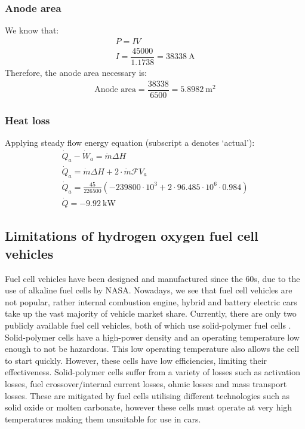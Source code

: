 \documentclass[11pt]{article}
\numberwithin{equation}{section}
\begin{document}
\subsubsection{Anode area}
We know that:
\begin{gather}
    P = IV\\
    I = \dfrac{45000}{1.1738} = \SI{38338}{\ampere}
\end{gather}
Therefore, the anode area necessary is:
\begin{gather}
    \textrm{Anode area} = \dfrac{38338}{6500} = \SI{5.8982}{\meter\squared}
\end{gather}
\subsubsection{Heat loss}
Applying steady flow energy equation (subscript a denotes `actual'):
\begin{gather}
    \dot{Q}_a - \dot{W}_a = \dot{m}\Delta H\\
    \dot{Q}_a = \dot{m}\Delta H + 2 \cdot \dot{m} \mathcal{F}V_{a}\\
    \dot{Q}_a = \frac{45}{226500}\left(-239800\cdot 10^3 + 2\cdot 96.485\cdot 10^6 \cdot 0.984\right)\\
    \dot{Q} = \SI{-9.92}{\kilo\watt}
\end{gather}
\subsection{Limitations of hydrogen oxygen fuel cell vehicles}
Fuel cell vehicles have been designed and manufactured since the 60s, due to the use of alkaline fuel cells by NASA. Nowadays, we see that fuel cell vehicles are not popular, rather internal combustion engine, hybrid and battery electric cars take up the vast majority of vehicle market share. Currently, there are only two publicly available fuel cell vehicles, both of which use solid-polymer fuel cells \cite{b3} \cite{b4}. Solid-polymer cells have a high-power density and an operating temperature low enough to not be hazardous. This low operating temperature also allows the cell to start quickly. However, these cells have low efficiencies, limiting their effectiveness. Solid-polymer cells suffer from a variety of losses such as activation losses, fuel crossover/internal current losses, ohmic losses and mass transport losses. These are mitigated by fuel cells utilising different technologies such as solid oxide or molten carbonate, however these cells must operate at very high temperatures making them unsuitable for use in cars.
\end{document}
